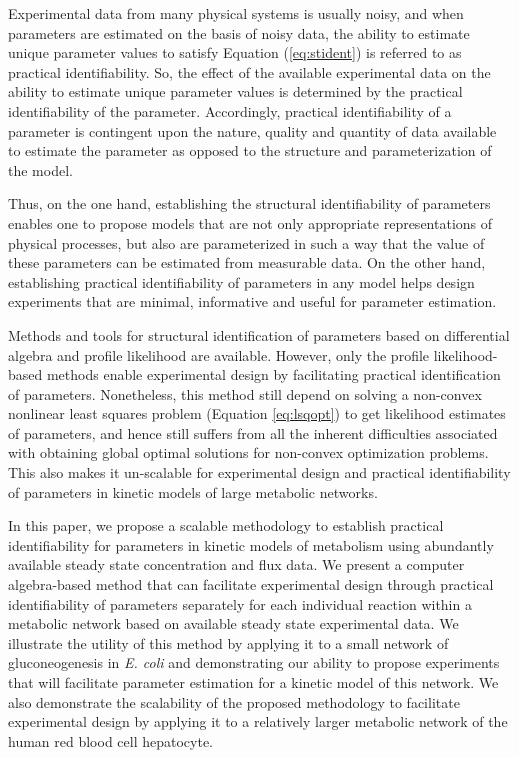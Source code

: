 \documentclass[10pt]{article}
\begin{document}
Experimental data from many physical systems is usually noisy, and when parameters are estimated on the basis of noisy data, the ability to estimate unique parameter values to satisfy Equation (\ref{eq:stident}) is referred to as practical identifiability. So, the effect of the available experimental data on the ability to estimate unique parameter values is determined by the practical identifiability of the parameter. Accordingly, practical identifiability of a parameter is contingent upon the nature, quality and quantity of data available to estimate the parameter as opposed to the structure and parameterization of the model. 

Thus, on the one hand, establishing the structural identifiability of parameters enables one to propose models that are not only appropriate representations of physical processes, but also are parameterized in such a way that the value of these parameters can be estimated from measurable data. On the other hand, establishing practical identifiability of parameters in any model helps design experiments that are minimal, informative and useful for parameter estimation.

Methods and tools for structural identification of parameters based on differential algebra \parencite{Ljung1994, Audoly2001, Bellu2007} and profile likelihood \parencite{Raue2009a} are available. However, only the profile likelihood-based methods enable experimental design by facilitating practical identification of parameters. Nonetheless, this method still depend on solving a non-convex nonlinear least squares problem (Equation \ref{eq:lsqopt}) to get likelihood estimates of parameters, and hence still suffers from all the inherent difficulties associated with obtaining global optimal solutions for non-convex optimization problems. This also makes it un-scalable for experimental design and practical identifiability of parameters in kinetic models of large metabolic networks.

In this paper, we propose a scalable methodology to establish practical identifiability for parameters in kinetic models of metabolism using abundantly available steady state concentration and flux data. We present a computer algebra-based method that can facilitate experimental design through practical identifiability of parameters separately for each individual reaction within a metabolic network based on available steady state experimental data. We illustrate the utility of this method by applying it to a small network of gluconeogenesis in \textit{E. coli} and demonstrating our ability to propose experiments that will facilitate parameter estimation for a kinetic model of this network. We also demonstrate the scalability of the proposed methodology to facilitate experimental design by applying it to a relatively larger metabolic network of the human red blood cell hepatocyte. 	
\end{document}
